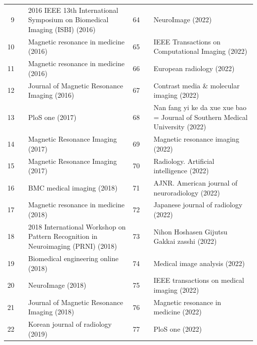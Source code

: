 \documentclass[11pt]{article}
\begin{document}
{\begin{longtable}{r l p{} r l p{}}
9 & \cite{elhabian2016compressive} & 2016 IEEE 13th International Symposium on Biomedical Imaging (ISBI) (2016) & 64 & \cite{zhang2022a} & NeuroImage (2022) \\
10 & \cite{lacerda2016diffusion} & Magnetic resonance in medicine (2016) & 65 & \cite{zibetti2022alternating} & IEEE Transactions on Computational Imaging (2022) \\
11 & \cite{zahneisen2016reverse} & Magnetic resonance in medicine (2016) & 66 & \cite{conklin2022clinical} & European radiology (2022) \\
12 & \cite{kayvanrad2016diagnostic} & Journal of Magnetic Resonance Imaging (2016) & 67 & \cite{sheng2022deep} & Contrast media \& molecular imaging (2022) \\
13 & \cite{esteban2017mriqc} & PloS one (2017) & 68 & \cite{huang2022deep} & Nan fang yi ke da xue xue bao = Journal of Southern Medical University (2022) \\
14 & \cite{kim2017artificial} & Magnetic Resonance Imaging (2017) & 69 & \cite{begnoche2022epi} & Magnetic resonance imaging (2022) \\
15 & \cite{chow2017modifiedbrisque} & Magnetic Resonance Imaging (2017) & 70 & \cite{radmanesh2022exploring} & Radiology. Artificial intelligence (2022) \\
16 & \cite{yu2018a} & BMC medical imaging (2018) & 71 & \cite{sannananja2022imagequality} & AJNR. American journal of neuroradiology (2022) \\
17 & \cite{gurbani2018a} & Magnetic resonance in medicine (2018) & 72 & \cite{yasaka2022impact} & Japanese journal of radiology (2022) \\
18 & \cite{fantini2018automatic} & 2018 International Workshop on Pattern Recognition in Neuroimaging (PRNI) (2018) & 73 & \cite{muro2022improvement} & Nihon Hoshasen Gijutsu Gakkai zasshi (2022) \\
19 & \cite{osadebey2018blind} & Biomedical engineering online (2018) & 74 & \cite{pirkl2022learning} & Medical image analysis (2022) \\
20 & \cite{risk2018impacts} & NeuroImage (2018) & 75 & \cite{yang2022modelbased} & IEEE transactions on medical imaging (2022) \\
21 & \cite{gong2018deep} & Journal of Magnetic Resonance Imaging (2018) & 76 & \cite{ma2022mitigating} & Magnetic resonance in medicine (2022) \\
22 & \cite{tang2019accelerated} & Korean journal of radiology (2019) & 77 & \cite{yoshida2022motion} & PloS one (2022) \\

\end{longtable}}
\end{document}
